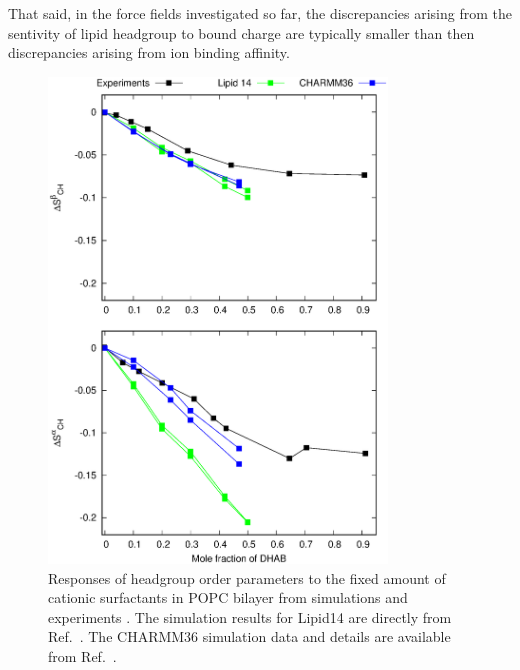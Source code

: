 \documentclass[journal=jpcbfk]{achemso}
\begin{document}
That said, in the force fields investigated so far, the discrepancies arising from the sentivity of lipid headgroup to
bound charge are typically smaller than then discrepancies arising from ion binding affinity.
\begin{figure}[]
  \centering
  \includegraphics[width=9.0cm]{../Figs/HGopsDHMDMAB.eps}
  \caption{\label{CHANGESwithDHMDMAB}
  Responses of headgroup order parameters to the fixed amount of cationic surfactants in
  POPC bilayer from simulations and experiments \cite{scherer89}.
  The simulation results for Lipid14 are directly from Ref.~.
  The CHARMM36 simulation data and details are available from Ref.~.
}
\end{figure}

\pagebreak
\end{document}
